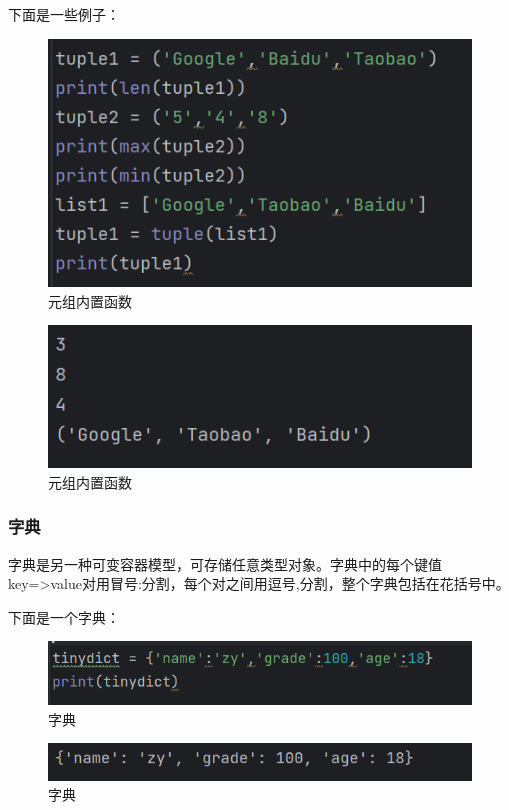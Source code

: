 \documentclass{ctexart}
\begin{document}
	下面是一些例子：
	
	\begin{figure}[H]
		\centering
		\includegraphics[scale=0.5]{3.40}
		\caption{元组内置函数}
	\end{figure}
	
	\begin{figure}[H]
		\centering
		\includegraphics[scale=0.5]{3.41}
		\caption{元组内置函数}
	\end{figure}
	
	\subsubsection{字典}
	字典是另一种可变容器模型，可存储任意类型对象。字典中的每个键值key=>value对用冒号:分割，每个对之间用逗号,分割，整个字典包括在花括号{}中。
	
	下面是一个字典：
	\begin{figure}[H]
		\centering
		\includegraphics[scale=0.5]{3.42}
		\caption{字典}
	\end{figure}
	
	\begin{figure}[H]
		\centering
		\includegraphics[scale=0.5]{3.43}
		\caption{字典}
	\end{figure}
	
\end{document}
